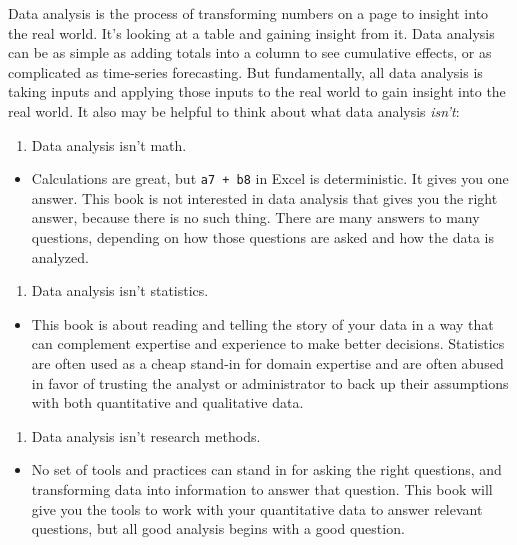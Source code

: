 \documentclass[]{book}
\providecommand{\tightlist}{%
  \setlength{\itemsep}{0pt}\setlength{\parskip}{0pt}}
\begin{document}
Data analysis is the process of transforming numbers on a page to insight into the real world. It's looking at a table and gaining insight from it. Data analysis can be as simple as adding totals into a column to see cumulative effects, or as complicated as time-series forecasting. But fundamentally, all data analysis is taking inputs and applying those inputs to the real world to gain insight into the real world. It also may be helpful to think about what data analysis \emph{isn't}:

\begin{enumerate}
\def\labelenumi{\arabic{enumi}.}
\tightlist
\item
  Data analysis isn't math.
\end{enumerate}

\begin{itemize}
\tightlist
\item
  Calculations are great, but \texttt{a7\ +\ b8} in Excel is deterministic. It gives you one answer. This book is not interested in data analysis that gives you the right answer, because there is no such thing. There are many answers to many questions, depending on how those questions are asked and how the data is analyzed.
\end{itemize}

\begin{enumerate}
\def\labelenumi{\arabic{enumi}.}
\setcounter{enumi}{1}
\tightlist
\item
  Data analysis isn't statistics.
\end{enumerate}

\begin{itemize}
\tightlist
\item
  This book is about reading and telling the story of your data in a way that can complement expertise and experience to make better decisions. Statistics are often used as a cheap stand-in for domain expertise and are often abused in favor of trusting the analyst or administrator to back up their assumptions with both quantitative and qualitative data.
\end{itemize}

\begin{enumerate}
\def\labelenumi{\arabic{enumi}.}
\setcounter{enumi}{2}
\tightlist
\item
  Data analysis isn't research methods.
\end{enumerate}

\begin{itemize}
\tightlist
\item
  No set of tools and practices can stand in for asking the right questions, and transforming data into information to answer that question. This book will give you the tools to work with your quantitative data to answer relevant questions, but all good analysis begins with a good question.
\end{itemize}
\end{document}

